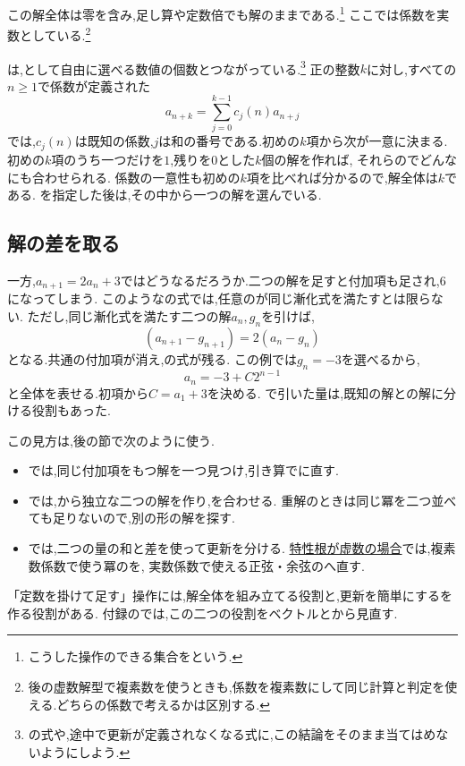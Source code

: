     この解全体は零を含み,足し算や定数倍でも解のままである.\footnote{こうした操作のできる集合を\textbf{}という.}
    ここでは係数を実数としている.\footnote{後の虚数解型で複素数を使うときも,係数を複素数にして同じ計算と判定を使える.どちらの係数で考えるかは区別する.}

    は,として自由に選べる数値の個数とつながっている.\footnote{の式や,途中で更新が定義されなくなる式に,この結論をそのまま当てはめないようにしよう.}
    正の整数$k$に対し,すべての$n\ge1$で係数が定義された
    \[
      a_{n+k}=\sum_{j=0}^{k-1}c_j(n)a_{n+j}
    \]
    では,$c_j(n)$は既知の係数,$j$は和の番号である.初めの$k$項から次が一意に決まる.
    初めの$k$項のうち一つだけを$1$,残りを$0$とした$k$個の解を作れば,
    それらのでどんなにも合わせられる.
    係数の一意性も初めの$k$項を比べれば分かるので,解全体は$k$である.
    を指定した後は,その中から一つの解を選んでいる.

  \subsection{解の差を取る}\label{節：非同次と解の組合せ}
    一方,$a_{n+1}=2a_n+3$ではどうなるだろうか.二つの解を足すと付加項も足され,$6$になってしまう.
    このようなの式では,任意のが同じ漸化式を満たすとは限らない.
    ただし,同じ漸化式を満たす二つの解$a_n,g_n$を引けば,
    \[
      (a_{n+1}-g_{n+1})=2(a_n-g_n)
    \]
    となる.共通の付加項が消え,の式が残る.
    この例では$g_n=-3$を選べるから,
    \[
      a_n=-3+C2^{n-1}
    \]
    と全体を表せる.初項から$C=a_1+3$を決める.
    で引いた量は,既知の解との解に分ける役割もあった.

    この見方は,後の節で次のように使う.
    \begin{itemize}
      \item {}では,同じ付加項をもつ解を一つ見つけ,引き算でに直す.
      \item {}では,から独立な二つの解を作り,を合わせる.
            重解のときは同じ冪を二つ並べても足りないので,別の形の解を探す.
      \item {}では,二つの量の和と差を使って更新を分ける.
            \hyperref[節：虚数解型隣接3項間漸化式]{特性根が虚数の場合}では,複素数係数で使う冪のを,
            実数係数で使える正弦・余弦のへ直す.
    \end{itemize}
    「定数を掛けて足す」操作には,解全体を組み立てる役割と,更新を簡単にするを作る役割がある.
    付録のでは,この二つの役割をベクトルとから見直す.
